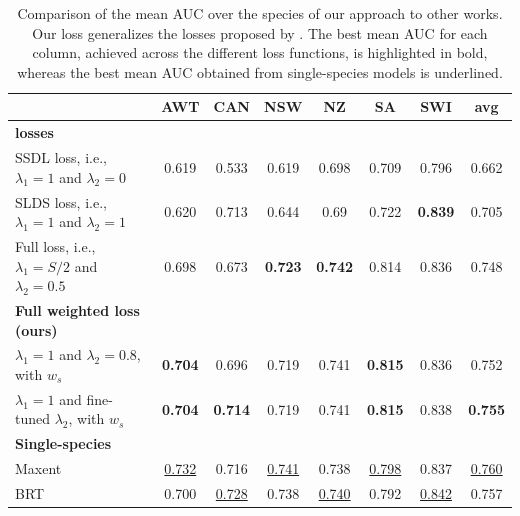 \begin{table}[]
\centering
\caption{Comparison of the mean AUC over the species of our approach to other works. Our loss generalizes the losses proposed by \citep{cole2023spatial}.
The best mean AUC for each column, achieved across the different loss functions, is highlighted in bold, whereas the best mean AUC obtained from single-species models is underlined.}

\setlength{\tabcolsep}{0.46\tabcolsep}  %
\renewcommand{\arraystretch}{1.2} %
\begin{tabular}{lccccccc}
                                                                          & AWT   & CAN   & NSW   & NZ    & SA    & SWI   & \textbf{avg}   \\ 
    
    \hline \hline
    \textbf{\cite{cole2023spatial} losses} \\
    SSDL loss, i.e., $\lambda_1 = 1$ and $\lambda_2=0$                    & 0.619 & 0.533 & 0.619 & 0.698 & 0.709 & 0.796 & 0.662 \\
    SLDS loss, i.e., $\lambda_1 = 1$ and $\lambda_2=1$                    & 0.620 & 0.713 & 0.644 & 0.69 & 0.722 & \textbf{0.839} & 0.705 \\
    Full loss, i.e., $\lambda_1 = S/2$ and $\lambda_2=0.5$                & 0.698 & 0.673 & \textbf{0.723} & \textbf{0.742} & 0.814 & 0.836 & 0.748 \\
    \hline
    \textbf{Full weighted loss (ours)} \\
    $\lambda_1=1 $ and $ \lambda_2=0.8$, with $w_s$                                   & \textbf{0.704} & 0.696 & 0.719 & 0.741 & \textbf{0.815} & 0.836 & 0.752 \\
    $\lambda_1=1 $ and fine-tuned $\lambda_2$, with $w_s$                             & \textbf{0.704} & \textbf{0.714} & 0.719 & 0.741 & \textbf{0.815} & 0.838 & \textbf{0.755} \\
    \hline \hline
    \textbf{Single-species \citep{phillips2009sample}} \\
    Maxent                                                                & \underline{0.732} & 0.716 & \underline{0.741} & 0.738 & \underline{0.798} & 0.837 & \underline{0.760} \\
    BRT                                                                   & 0.700 & \underline{0.728} & 0.738 & \underline{0.740} & 0.792 & \underline{0.842} & 0.757 \\
    \hline
\end{tabular}
\vspace{0.1cm} \\

\label{tab:comparison}
\end{table}
